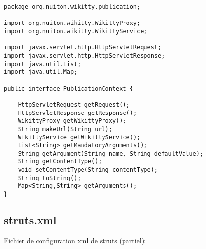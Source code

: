 \begin{lstlisting}
package org.nuiton.wikitty.publication;

import org.nuiton.wikitty.WikittyProxy;
import org.nuiton.wikitty.WikittyService;

import javax.servlet.http.HttpServletRequest;
import javax.servlet.http.HttpServletResponse;
import java.util.List;
import java.util.Map;

public interface PublicationContext {

    HttpServletRequest getRequest();
    HttpServletResponse getResponse();
    WikittyProxy getWikittyProxy();
    String makeUrl(String url);
    WikittyService getWikittyService();
    List<String> getMandatoryArguments();
    String getArgument(String name, String defaultValue);
    String getContentType();
    void setContentType(String contentType);
    String toString();
    Map<String,String> getArguments();
}

\end{lstlisting}

\subsection*{struts.xml}

Fichier de configuration xml de struts (partiel):




